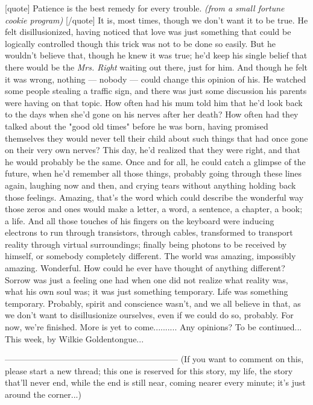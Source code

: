 [quote]
Patience is the best remedy for every trouble. 
\emph{(from a small fortune cookie program)}
[/quote]
It is, most times, though we don't want it to be true. 
He felt disillusionized, having noticed that love was just something that could be logically controlled though this trick was not to be done so easily. But he wouldn't believe that, though he knew it was true; he'd keep his single belief that there would be the \emph{Mrs. Right} waiting out there, just for him. And though he felt it was wrong, nothing --- nobody --- could change this opinion of his. 
He watched some people stealing a traffic sign, and there was just some discussion his parents were having on that topic. How often had his mum told him that he'd look back to the days when she'd gone on his nerves after her death? How often had they talked about the "good old times" before he was born, having promised themselves they would never tell their child about such things that had once gone on their very own nerves?
This day, he'd realized that they were right, and that he would probably be the same. Once and for all, he could catch a glimpse of the future, when he'd remember all those things, probably going through these lines again, laughing now and then, and crying tears without anything holding back those feelings. Amazing, that's the word which could describe the wonderful way those zeros and ones would make a letter, a word, a sentence, a chapter, a book; a life. 
And all those touches of his fingers on the keyboard were inducing electrons to run through transistors, through cables, transformed to transport reality through virtual surroundings; finally being photons to be received by himself, or somebody completely different. 
The world was amazing, impossibly amazing. Wonderful. How could he ever have thought of anything different? Sorrow was just a feeling one had when one did not realize what reality was, what his own soul was; it was just something temporary. 
Life was something temporary. 
Probably, spirit and conscience wasn't, and we all believe in that, as we don't want to disillusionize ourselves, even if we could do so, probably. 
For now, we're finished. 
More is yet to come..........
Any opinions?
To be continued...
This week, by Wilkie Goldentongue...

--------------------------------------------------------------
(If you want to comment on this, please start a new thread; this one is reserved for this story, my life, the story that'll never end, while the end is still near, coming nearer every minute; it's just around the corner...)

